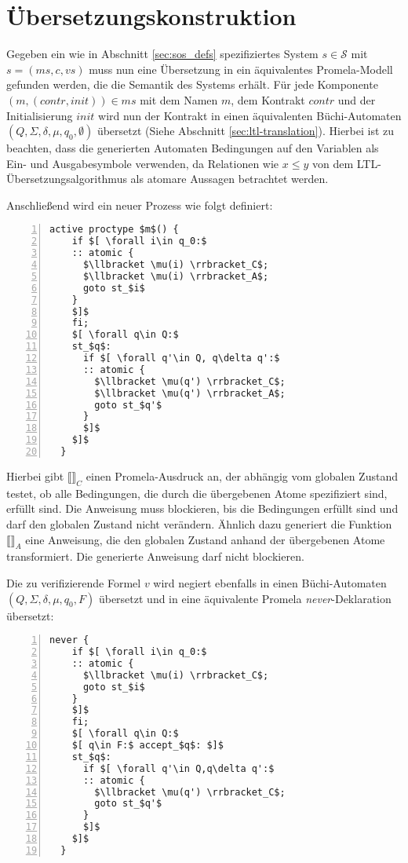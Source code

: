 \section{Übersetzungskonstruktion}
Gegeben ein wie in Abschnitt \ref{sec:sos_defs} spezifiziertes System $s\in \mathcal{S}$ mit $s=(ms,c,vs)$ muss nun eine Übersetzung in ein äquivalentes Promela-Modell gefunden werden, die die Semantik des Systems erhält.
Für jede Komponente $(m,(\mathit{contr},\mathit{init}))\in ms$ mit dem Namen $m$, dem Kontrakt $\mathit{contr}$ und der Initialisierung $\mathit{init}$ wird nun der Kontrakt in einen äquivalenten Büchi-Automaten $(Q,\Sigma,\delta,\mu,q_0,\emptyset)$ übersetzt (Siehe Abschnitt \ref{sec:ltl-translation}).
Hierbei ist zu beachten, dass die generierten Automaten Bedingungen auf den Variablen als Ein- und Ausgabesymbole verwenden, da Relationen wie $x\leq y$ von dem LTL-Übersetzungsalgorithmus als atomare Aussagen betrachtet werden.


Anschließend wird ein neuer Prozess wie folgt definiert:
\begin{lstlisting}[language=Promela,mathescape=true,numbers=left,numberstyle=\small]
  active proctype $m$() {
    if $[ \forall i\in q_0:$
    :: atomic {
      $\llbracket \mu(i) \rrbracket_C$;
      $\llbracket \mu(i) \rrbracket_A$;
      goto st_$i$
    }
    $]$
    fi;
    $[ \forall q\in Q:$
    st_$q$:
      if $[ \forall q'\in Q, q\delta q':$
      :: atomic {
        $\llbracket \mu(q') \rrbracket_C$;
        $\llbracket \mu(q') \rrbracket_A$;
        goto st_$q'$
      }
      $]$
    $]$
  }
\end{lstlisting}
Hierbei gibt $\llbracket\rrbracket_C$ einen Promela-Ausdruck an, der abhängig vom globalen Zustand testet, ob alle Bedingungen, die durch die übergebenen Atome spezifiziert sind, erfüllt sind.
Die Anweisung muss blockieren, bis die Bedingungen erfüllt sind und darf den globalen Zustand nicht verändern.
Ähnlich dazu generiert die Funktion $\llbracket\rrbracket_A$ eine Anweisung, die den globalen Zustand anhand der übergebenen Atome transformiert.
Die generierte Anweisung darf nicht blockieren.

Die zu verifizierende Formel $v$ wird negiert ebenfalls in einen Büchi-Automaten $(Q,\Sigma,\delta,\mu,q_0,F)$ übersetzt und in eine äquivalente Promela \emph{never}-Deklaration übersetzt:
\begin{lstlisting}[language=Promela,mathescape=true,numbers=left,numberstyle=\small]
  never {
    if $[ \forall i\in q_0:$
    :: atomic {
      $\llbracket \mu(i) \rrbracket_C$;
      goto st_$i$
    }
    $]$
    fi;
    $[ \forall q\in Q:$
    $[ q\in F:$ accept_$q$: $]$
    st_$q$:
      if $[ \forall q'\in Q,q\delta q':$
      :: atomic {
        $\llbracket \mu(q') \rrbracket_C$;
        goto st_$q'$
      }
      $]$
    $]$
  }
\end{lstlisting}
